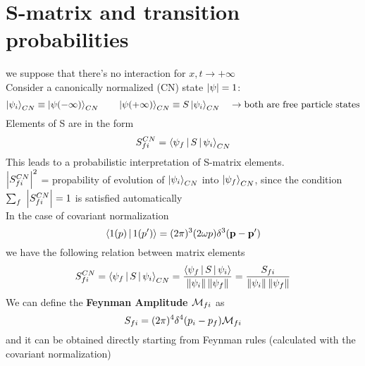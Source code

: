 \section{S-matrix and transition probabilities}
we suppose that there's no interaction for $x, t \to +\infty$\\
Consider a canonically normalized (CN) state $\abs{\psi} = 1$:
\[
\Ket{\psi_i}_{CN} \equiv \Ket{\psi(-\infty)}_{CN}
\qquad
\Ket{\psi(+\infty)}_{CN} \equiv S \Ket{\psi_i}_{CN}
\quad \to \textup{both are free particle states}
\]
Elements of S are in the form
\[
S_{fi}^{CN} = \Braket{\psi_f | S | \psi_i}_{CN}
\]
This leads to a probabilistic interpretation of S-matrix elements.\\
$\abs{S_{fi}^{CN}}^2$ = propability of evolution of $\Ket{\psi_i}_{CN}$ into $\Ket{\psi_f}_{CN}$, since the condition $\sum_f \ \abs{S_{fi}^{CN}} = 1$ is satisfied automatically\\
In the case of covariant normalization
\[
\Braket{1(p) | 1(p')} = (2 \pi)^3 (2 \omega p)\delta^3 (\vec{p} - \vec{p}')
\]
we have the following relation between matrix elements
\[
S_{fi}^{CN} = \Braket{\psi_f | S |\psi_i}_{CN} = \frac{\Braket{\psi_f | S | \psi_i}}{\norma{\psi_i} \norma{\psi_f}} = \frac{S_{fi}}{\norma{\psi_i} \norma{\psi_f}}
\]
We can define the \textbf{Feynman Amplitude $\mathM_{fi}$} as
\[
S_{fi} = (2 \pi)^4 \delta^4 (p_i - p_f) \mathM_{fi}
\]
and it can be obtained directly starting from Feynman rules (calculated with the covariant normalization)

